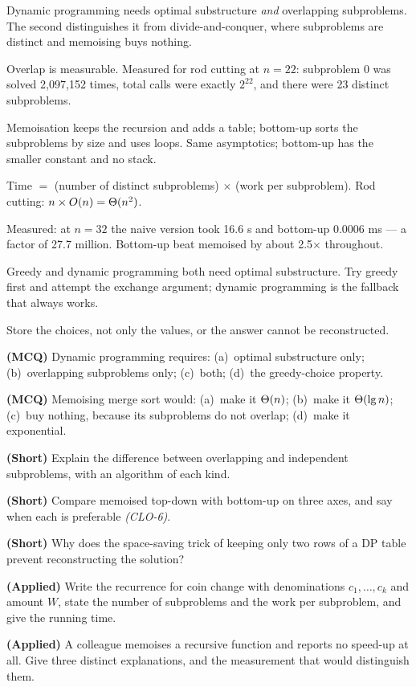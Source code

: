 \begin{chaptersummary}
\begin{tight}
  \item Dynamic programming needs optimal substructure \emph{and} overlapping
        subproblems. The second distinguishes it from divide-and-conquer, where
        subproblems are distinct and memoising buys nothing.
  \item Overlap is measurable. Measured for rod cutting at $n = 22$: subproblem
        0 was solved 2{,}097{,}152 times, total calls were exactly $2^{22}$,
        and there were 23 distinct subproblems.
  \item Memoisation keeps the recursion and adds a table; bottom-up sorts the
        subproblems by size and uses loops. Same asymptotics; bottom-up has the
        smaller constant and no stack.
  \item Time $=$ (number of distinct subproblems) $\times$ (work per
        subproblem). Rod cutting: $n \times O(n) = \Theta(n^{2})$.
  \item Measured: at $n = 32$ the naive version took 16.6 s and bottom-up
        0.0006 ms --- a factor of 27.7 million. Bottom-up beat memoised by
        about 2.5$\times$ throughout.
  \item Greedy and dynamic programming both need optimal substructure. Try
        greedy first and attempt the exchange argument; dynamic programming is
        the fallback that always works.
  \item Store the choices, not only the values, or the answer cannot be
        reconstructed.
\end{tight}
\end{chaptersummary}

\begin{reviewq}
  \item \textbf{(MCQ)} Dynamic programming requires: (a)~optimal substructure
        only; (b)~overlapping subproblems only; (c)~both; (d)~the
        greedy-choice property.
  \item \textbf{(MCQ)} Memoising merge sort would:
        (a)~make it $\Theta(n)$; (b)~make it $\Theta(\operatorname{lg} n)$; (c)~buy nothing,
        because its subproblems do not overlap; (d)~make it exponential.
  \item \textbf{(Short)} Explain the difference between overlapping and
        independent subproblems, with an algorithm of each kind.
  \item \textbf{(Short)} Compare memoised top-down with bottom-up on three
        axes, and say when each is preferable \emph{(CLO-6)}.
  \item \textbf{(Short)} Why does the space-saving trick of keeping only two
        rows of a DP table prevent reconstructing the solution?
  \item \textbf{(Applied)} Write the recurrence for coin change with
        denominations $c_{1},\ldots,c_{k}$ and amount $W$, state the number of
        subproblems and the work per subproblem, and give the running time.
  \item \textbf{(Applied)} A colleague memoises a recursive function and reports
        no speed-up at all. Give three distinct explanations, and the
        measurement that would distinguish them.
\end{reviewq}
